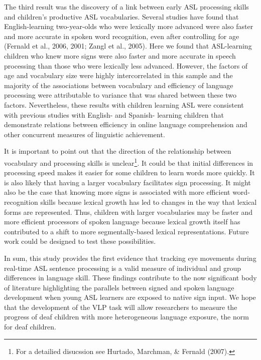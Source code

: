 \documentclass[12pt,]{article}
\let\rmarkdownfootnote\footnote%
\def\footnote{\protect\rmarkdownfootnote}
\begin{document}
The third result was the discovery of a link between early ASL
processing skills and children's productive ASL vocabularies. Several
studies have found that English-learning two-year-olds who were
lexically more advanced were also faster and more accurate in spoken
word recognition, even after controlling for age (Fernald et al., 2006,
2001; Zangl et al., 2005). Here we found that ASL-learning children who
knew more signs were also faster and more accurate in speech processing
than those who were lexically less advanced. However, the factors of age
and vocabulary size were highly intercorrelated in this sample and the
majority of the associations between vocabulary and efficiency of
language processing were attributable to variance that was shared
between these two factors. Nevertheless, these results with children
learning ASL were consistent with previous studies with English- and
Spanish- learning children that demonstrate relations between efficiency
in online language comprehension and other concurrent measures of
linguistic achievement.

It is important to point out that the direction of the relationship
between vocabulary and processing skills is unclear\footnote{For a
  detailied disucssion see Hurtado, Marchman, \& Fernald (2007).}. It
could be that initial differences in processing speed makes it easier
for some children to learn words more quickly. It is also likely that
having a larger vocabulary facilitates sign processing. It might also be
the case that knowing more signs is associated with more efficient
word-recognition skills because lexical growth has led to changes in the
way that lexical forms are represented. Thus, children with larger
vocabularies may be faster and more efficient processors of spoken
language because lexical growth itself has contributed to a shift to
more segmentally-based lexical representations. Future work could be
designed to test these possibilities.

In sum, this study provides the first evidence that tracking eye
movements during real-time ASL sentence processing is a valid measure of
individual and group differences in language skill. These findings
contribute to the now significant body of literature highlighting the
parallels between signed and spoken language development when young ASL
learners are exposed to native sign input. We hope that the development
of the VLP task will allow researchers to measure the progress of deaf
children with more heterogeneous language exposure, the norm for deaf
children.
\end{document}
